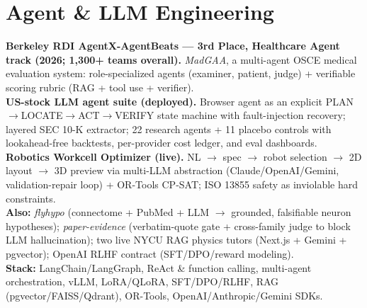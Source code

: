 \documentclass[letterpaper,9pt]{extarticle}
\newcommand{\resumeSubHeadingListStart}{\begin{itemize}[leftmargin=0.12in, label={}]}
\newcommand{\resumeSubHeadingListEnd}{\end{itemize}}
\begin{document}
\section{Agent \& LLM Engineering}
\resumeSubHeadingListStart
  \small{\item{
    \textbf{Berkeley RDI AgentX-AgentBeats — 3rd Place, Healthcare Agent track (2026; 1,300+ teams overall).} \textit{MadGAA}, a multi-agent OSCE medical evaluation system: role-specialized agents (examiner, patient, judge) + verifiable scoring rubric (RAG + tool use + verifier). \\ \vspace{2pt}
    \textbf{US-stock LLM agent suite (deployed).} Browser agent as an explicit PLAN$\rightarrow$LOCATE$\rightarrow$ACT$\rightarrow$VERIFY state machine with fault-injection recovery; layered SEC 10-K extractor; 22 research agents + 11 placebo controls with lookahead-free backtests, per-provider cost ledger, and eval dashboards. \\ \vspace{2pt}
    \textbf{Robotics Workcell Optimizer (live).} NL $\rightarrow$ spec $\rightarrow$ robot selection $\rightarrow$ 2D layout $\rightarrow$ 3D preview via multi-LLM abstraction (Claude/OpenAI/Gemini, validation-repair loop) + OR-Tools CP-SAT; ISO 13855 safety as inviolable hard constraints. \\ \vspace{2pt}
    \textbf{Also:} \textit{flyhypo} (connectome + PubMed + LLM $\rightarrow$ grounded, falsifiable neuron hypotheses); \textit{paper-evidence} (verbatim-quote gate + cross-family judge to block LLM hallucination); two live NYCU RAG physics tutors (Next.js + Gemini + pgvector); OpenAI RLHF contract (SFT/DPO/reward modeling). \\ \vspace{2pt}
    \textbf{Stack:} LangChain/LangGraph, ReAct \& function calling, multi-agent orchestration, vLLM, LoRA/QLoRA, SFT/DPO/RLHF, RAG (pgvector/FAISS/Qdrant), OR-Tools, OpenAI/Anthropic/Gemini SDKs.
  }}
\resumeSubHeadingListEnd

\end{document}
